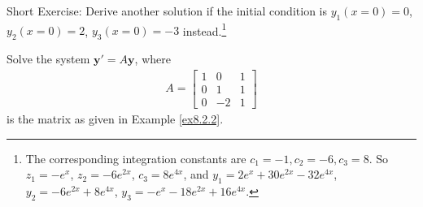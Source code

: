 Short Exercise: Derive another solution if the initial condition is $y_1(x=0) = 0$, $y_2(x=0) = 2$, $y_3(x=0) = -3$ instead.\footnote{The corresponding integration constants are $c_1 = -1, c_2 = -6, c_3 = 8$. So $z_1 = -e^x$, $z_2 = -6e^{2x}$, $c_3 = 8e^{4x}$, and $y_1 = 2e^x + 30e^{2x} - 32e^{4x}$, $y_2 = -6e^{2x} + 8e^{4x}$, $y_3 = -e^x - 18e^{2x} + 16e^{4x}$.}

\begin{exmp}
\label{exmp:solveODEsystemcomplex}
Solve the system $\textbf{y}' = A\textbf{y}$, where
\begin{align*}
A = 
\begin{bmatrix}
1 & 0 & 1 \\
0 & 1 & 1 \\
0 & -2 & 1
\end{bmatrix}   
\end{align*}
is the matrix as given in Example \ref{ex8.2.2}.
\end{exmp}
